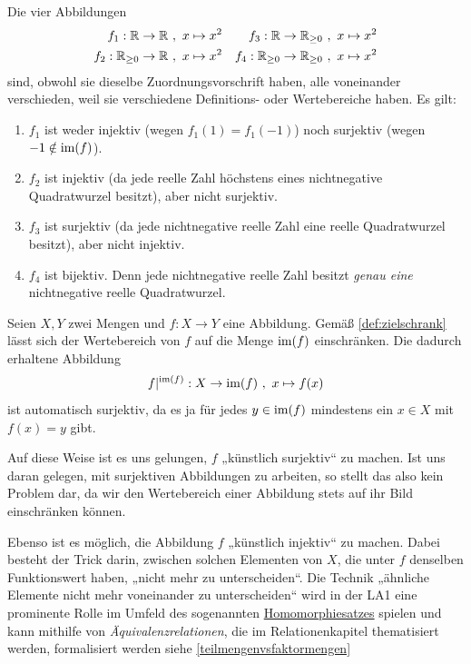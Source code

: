 \begin{bsp} \label{bsp:injsur}
    Die vier Abbildungen
    \begin{align*}
        f_1 : \mathbb R \to \mathbb R \ &,\ x\mapsto x^2 & f_3 :\mathbb R\to \mathbb R_{\ge 0} \ &,\ x\mapsto x^2 \\
        f_2 : \mathbb R_{\ge 0} \to \mathbb R \ &,\ x\mapsto x^2 & f_4 :\mathbb R_{\ge 0} \to \mathbb R_{\ge 0} \ &,\ x\mapsto x^2
    \end{align*}
    sind, obwohl sie dieselbe Zuordnungsvorschrift haben, alle voneinander verschieden, weil sie verschiedene Definitions- oder Wertebereiche haben. Es gilt:
    \begin{enumerate}
        \item $f_1$ ist weder injektiv (wegen $f_1(1)=f_1(-1)$) noch surjektiv (wegen $-1\notin \operatorname{im}(f)$).
        \item $f_2$ ist injektiv (da jede reelle Zahl höchstens eines nichtnegative Quadratwurzel besitzt), aber nicht surjektiv.
        \item $f_3$ ist surjektiv (da jede nichtnegative reelle Zahl eine reelle Quadratwurzel besitzt), aber nicht injektiv.
        \item $f_4$ ist bijektiv. Denn jede nichtnegative reelle Zahl besitzt \emph{genau eine} nichtnegative reelle Quadratwurzel.
    \end{enumerate}
\end{bsp}


\begin{vorschau} \label{surjektivmachen}
    Seien $X,Y$ zwei Mengen und $f:X\to Y$ eine Abbildung. Gemäß \cref{def:zielschrank} lässt sich der Wertebereich von $f$ auf die Menge $\operatorname{im}(f)$ einschränken. Die dadurch erhaltene Abbildung
        \[ f\vert^{\operatorname{im}(f)} : X \to \operatorname{im}(f) \ ,\ x\mapsto f(x) \]
    ist automatisch surjektiv, da es ja für jedes $y\in \operatorname{im}(f)$ mindestens ein $x\in X$ mit $f(x)=y$ gibt.

    Auf diese Weise ist es uns gelungen, $f$ „künstlich surjektiv“ zu machen. Ist uns daran gelegen, mit surjektiven Abbildungen zu arbeiten, so stellt das also kein Problem dar, da wir den Wertebereich einer Abbildung stets auf ihr Bild einschränken können.

    Ebenso ist es möglich, die Abbildung $f$ „künstlich injektiv“ zu machen. Dabei besteht der Trick darin, zwischen solchen Elementen von $X$, die unter $f$ denselben Funktionswert haben, „nicht mehr zu unterscheiden“. Die Technik „ähnliche Elemente nicht mehr voneinander zu unterscheiden“ wird in der LA1 eine prominente Rolle im Umfeld des sogenannten \href{https://de.wikipedia.org/wiki/Homomorphiesatz}{Homomorphiesatzes} spielen und kann mithilfe von \emph{Äquivalenzrelationen}, die im Relationenkapitel thematisiert werden, formalisiert werden siehe \cref{teilmengenvsfaktormengen}
\end{vorschau}





